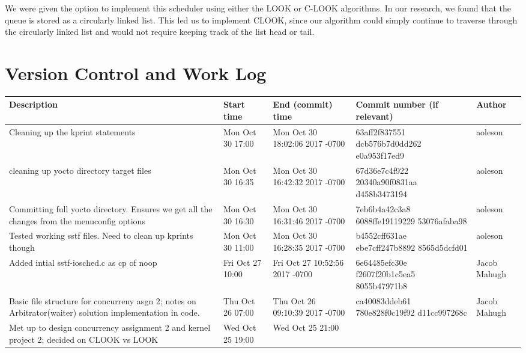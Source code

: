 \documentclass[letterpaper,10pt,titlepage]{article}
\begin{document}
We were given the option to implement this scheduler using either the LOOK or C-LOOK algorithms.
In our research, we found that the queue is stored as a circularly linked list. 
This led us to implement CLOOK, since our algorithm could simply continue to traverse through the circularly linked list and would not require keeping track of the list head or tail.

\section{Version Control and Work Log}
\begin{table}[H]
\centering
\begin{tabular}{|p{3cm}|p{2cm}|p{2cm}|p{3cm}|p{2cm}|}
\hline
Description                                                                                              & Start time       & End (commit) time              & Commit number (if relevant)              & Author       \\
\hline
Cleaning up the kprint statements                                                                        & Mon Oct 30 17:00 & Mon Oct 30 18:02:06 2017 -0700 & 63aff2f837551 dcb576b7d0dd262 e0a953f17ed9 & aoleson      \\
\hline
cleaning up yocto directory target files                                                                 & Mon Oct 30 16:35 & Mon Oct 30 16:42:32 2017 -0700 & 67d36e7c4f922 20340a90f0831aa d458b3473194 & aoleson      \\
\hline
Committing full yocto directory. Ensures we get all the changes from the menuconfig options              & Mon Oct 30 16:30 & Mon Oct 30 16:31:46 2017 -0700 & 7eb6b4a42c3a8 6088ffe19119229 53076afaba98 & aoleson      \\
\hline
Tested working sstf files. Need to clean up kprints though                                               & Mon Oct 30 11:00 & Mon Oct 30 16:28:35 2017 -0700 & b4552cff631ae ebe7cff247b8892 8565d5dcfd01 & aoleson      \\
\hline
Added intial sstf-iosched.c as cp of noop                                                                & Fri Oct 27 10:00 & Fri Oct 27 10:52:56 2017 -0700 & 6e64485efc30e f2607f20b1c5ea5 8055b47971b8 & Jacob Mahugh \\
\hline
Basic file structure for concurreny asgn 2; notes on Arbitrator(waiter) solution implementation in code. & Thu Oct 26 07:00 & Thu Oct 26 09:10:39 2017 -0700 & ca40083ddeb61 780e828f0c19f92 d11cc997268c & Jacob Mahugh \\
\hline
Met up to design concurrency assignment 2 and kernel project 2; decided on CLOOK vs LOOK                 & Wed Oct 25 19:00 & Wed Oct 25 21:00               &                                          &             	 \\
\hline
\end{tabular}
\end{table}
\end{document}
